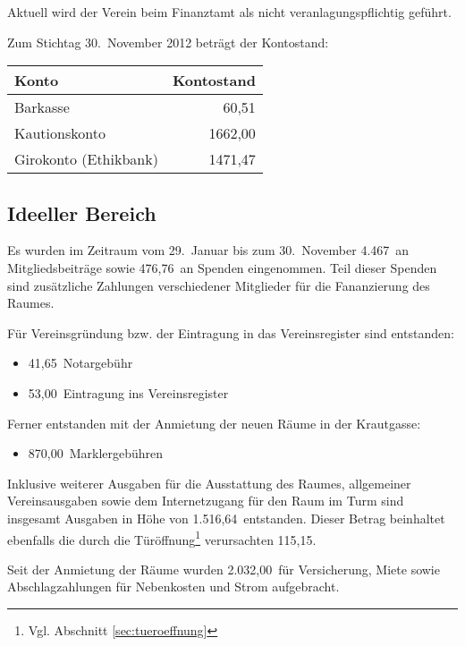 \documentclass[10pt,DIV16]{scrartcl}
\begin{document}
Aktuell wird der Verein beim Finanztamt als nicht veranlagungspflichtig
geführt.

Zum Stichtag 30.~November 2012 beträgt der Kontostand:

\begin{table}[h!]
	\centering
	\begin{tabular}{l|r}
		\textbf{Konto} & \textbf{Kontostand}  \\ \hline
		Barkasse & 60,51\EUR\\
		Kautionskonto & 1662,00\EUR\\
		Girokonto (Ethikbank) & 1471,47\EUR\\
	\end{tabular}
\end{table}

\subsection{Ideeller Bereich} 

Es wurden im Zeitraum vom 29.~Januar bis zum 30.~November 4.467\EUR\ 
an Mitgliedsbeiträge sowie 476,76\EUR\ an Spenden eingenommen. Teil 
dieser Spenden sind zusätzliche Zahlungen verschiedener Mitglieder 
für die Fananzierung des Raumes. 

Für Vereinsgründung bzw. der Eintragung in das Vereinsregister sind 
entstanden: 

\begin{itemize}
	\item 41,65\EUR\ Notargebühr
	\item 53,00\EUR\ Eintragung ins Vereinsregister
\end{itemize}

\noindent{} Ferner entstanden mit der Anmietung der neuen Räume in 
der Krautgasse:

\begin{itemize}
	\item 870,00\EUR\ Marklergebühren
\end{itemize}

Inklusive weiterer Ausgaben für die Ausstattung des Raumes,
allgemeiner Vereinsausgaben sowie dem Internetzugang für den Raum im
Turm sind insgesamt Ausgaben in Höhe von 1.516,64\EUR\ entstanden.
Dieser Betrag beinhaltet ebenfalls die durch die Türöffnung\footnote
{Vgl. Abschnitt \ref{sec:tueroeffnung}} verursachten 115,15\EUR.

Seit der Anmietung der Räume wurden 2.032,00\EUR\ für Versicherung,
Miete sowie Abschlagzahlungen für Nebenkosten und Strom aufgebracht. 
\end{document}
